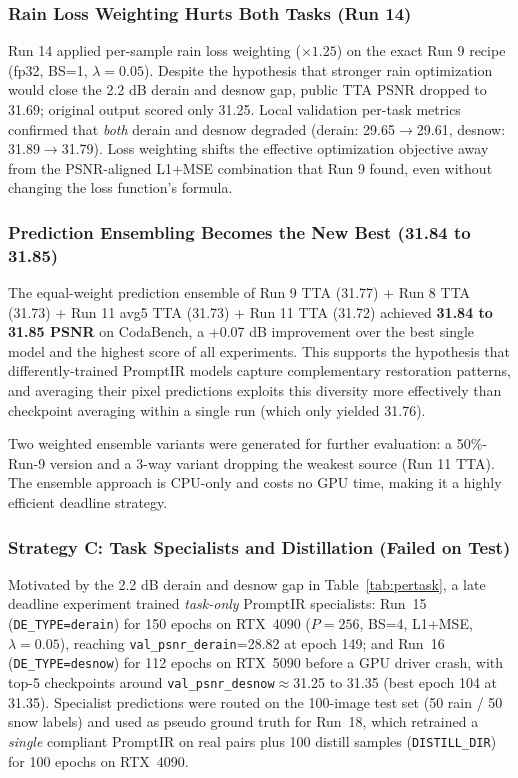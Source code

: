 \documentclass[12pt, a4paper]{article}
\begin{document}
\subsubsection{Rain Loss Weighting Hurts Both Tasks (Run 14)}
Run 14 applied per-sample rain loss weighting ($\times 1.25$) on the exact Run 9 recipe (fp32, BS=1, $\lambda=0.05$). Despite the hypothesis that stronger rain optimization would close the 2.2 dB derain and desnow gap, public TTA PSNR dropped to 31.69; original output scored only 31.25. Local validation per-task metrics confirmed that \emph{both} derain and desnow degraded (derain: 29.65$\to$29.61, desnow: 31.89$\to$31.79). Loss weighting shifts the effective optimization objective away from the PSNR-aligned L1+MSE combination that Run 9 found, even without changing the loss function's formula.

\subsubsection{Prediction Ensembling Becomes the New Best (31.84 to 31.85)}
The equal-weight prediction ensemble of Run 9 TTA (31.77) + Run 8 TTA (31.73) + Run 11 avg5 TTA (31.73) + Run 11 TTA (31.72) achieved \textbf{31.84 to 31.85 PSNR} on CodaBench, a +0.07 dB improvement over the best single model and the highest score of all experiments. This supports the hypothesis that differently-trained PromptIR models capture complementary restoration patterns, and averaging their pixel predictions exploits this diversity more effectively than checkpoint averaging within a single run (which only yielded 31.76).

Two weighted ensemble variants were generated for further evaluation: a 50\%-Run-9 version and a 3-way variant dropping the weakest source (Run 11 TTA). The ensemble approach is CPU-only and costs no GPU time, making it a highly efficient deadline strategy.

\subsubsection{Strategy C: Task Specialists and Distillation (Failed on Test)}
Motivated by the 2.2 dB derain and desnow gap in Table~\ref{tab:pertask}, a late deadline experiment trained \emph{task-only} PromptIR specialists: Run~15 (\texttt{DE\_TYPE=derain}) for 150 epochs on RTX~4090 ($P=256$, BS=4, L1+MSE, $\lambda=0.05$), reaching \texttt{val\_psnr\_derain}=28.82 at epoch 149; and Run~16 (\texttt{DE\_TYPE=desnow}) for 112 epochs on RTX~5090 before a GPU driver crash, with top-5 checkpoints around \texttt{val\_psnr\_desnow}$\approx$31.25 to 31.35 (best epoch 104 at 31.35). Specialist predictions were routed on the 100-image test set (50 rain / 50 snow labels) and used as pseudo ground truth for Run~18, which retrained a \emph{single} compliant PromptIR on real pairs plus 100 distill samples (\texttt{DISTILL\_DIR}) for 100 epochs on RTX~4090.
\end{document}

